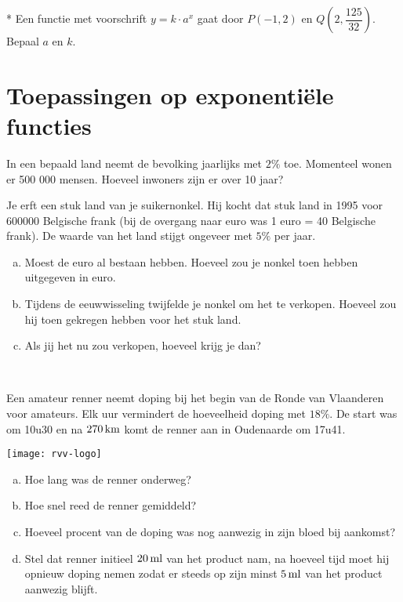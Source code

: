 \documentclass[12pt,twoside]{article}
\begin{document}
\begin{oefening}*
Een functie met voorschrift $y=k\cdot a^x$ gaat door $P(-1,2)$ en $Q(2,\dfrac{125}{32})$. Bepaal $a$ en $k$.
\end{oefening}

\pagebreak
\section{Toepassingen op exponentiële functies}

\begin{oefening}
In een bepaald land neemt de bevolking jaarlijks met $2\%$ toe. Momenteel wonen er 500 000 mensen. Hoeveel inwoners zijn er over 10 jaar?
\end{oefening}

\begin{oefening}
  Je erft een stuk land van je suikernonkel. Hij kocht dat stuk land in 1995 voor $600000$ Belgische frank (bij de overgang naar euro was 1 euro = 40 Belgische frank). De waarde van het land stijgt ongeveer met $5\%$ per jaar.
  \begin{enumerate}[(a)]
  \item Moest de euro al bestaan hebben. Hoeveel zou je nonkel toen hebben uitgegeven in euro.
  \item Tijdens de eeuwwisseling twijfelde je nonkel om het te verkopen. Hoeveel zou hij toen gekregen hebben voor het stuk land.
  \item Als jij het nu zou verkopen, hoeveel krijg je dan?
  \end{enumerate}
\end{oefening}

\begin{oefening}\\[-1.5cm]
  \begin{minipage}{0.6\linewidth}
    Een amateur renner neemt doping bij het begin van de Ronde van Vlaanderen voor amateurs. Elk uur vermindert de hoeveelheid doping met $18\%$. De start was om 10u30 en na $270 \km$ komt de renner aan in Oudenaarde om 17u41.
  \end{minipage}
  \begin{minipage}{0.39\linewidth}
    \vspace{-0.5cm}
    \texttt{[image: rvv-logo]}
  \end{minipage}
  \vspace{-1.5cm}
  \begin{enumerate}[(a)]
  \item Hoe lang was de renner onderweg?
  \item Hoe snel reed de renner gemiddeld?
  \item Hoeveel procent van de doping was nog aanwezig in zijn bloed bij aankomst?
  \item Stel dat renner initieel $20 \ml$ van het product nam, na hoeveel tijd moet hij opnieuw doping nemen zodat er steeds op zijn minst $5 \ml$ van het product aanwezig blijft.
  \end{enumerate}
\end{oefening}
\end{document}
